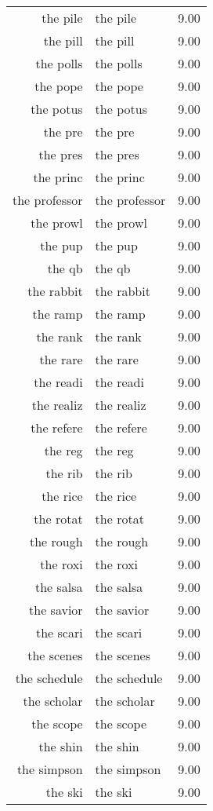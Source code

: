 \begin{table}[ht]
\begin{tabular}{rlr}
  the pile & the pile & 9.00 \\ 
  the pill & the pill & 9.00 \\ 
  the polls & the polls & 9.00 \\ 
  the pope & the pope & 9.00 \\ 
  the potus & the potus & 9.00 \\ 
  the pre & the pre & 9.00 \\ 
  the pres & the pres & 9.00 \\ 
  the princ & the princ & 9.00 \\ 
  the professor & the professor & 9.00 \\ 
  the prowl & the prowl & 9.00 \\ 
  the pup & the pup & 9.00 \\ 
  the qb & the qb & 9.00 \\ 
  the rabbit & the rabbit & 9.00 \\ 
  the ramp & the ramp & 9.00 \\ 
  the rank & the rank & 9.00 \\ 
  the rare & the rare & 9.00 \\ 
  the readi & the readi & 9.00 \\ 
  the realiz & the realiz & 9.00 \\ 
  the refere & the refere & 9.00 \\ 
  the reg & the reg & 9.00 \\ 
  the rib & the rib & 9.00 \\ 
  the rice & the rice & 9.00 \\ 
  the rotat & the rotat & 9.00 \\ 
  the rough & the rough & 9.00 \\ 
  the roxi & the roxi & 9.00 \\ 
  the salsa & the salsa & 9.00 \\ 
  the savior & the savior & 9.00 \\ 
  the scari & the scari & 9.00 \\ 
  the scenes & the scenes & 9.00 \\ 
  the schedule & the schedule & 9.00 \\ 
  the scholar & the scholar & 9.00 \\ 
  the scope & the scope & 9.00 \\ 
  the shin & the shin & 9.00 \\ 
  the simpson & the simpson & 9.00 \\ 
  the ski & the ski & 9.00 \\ 

\end{tabular}
\end{table}
